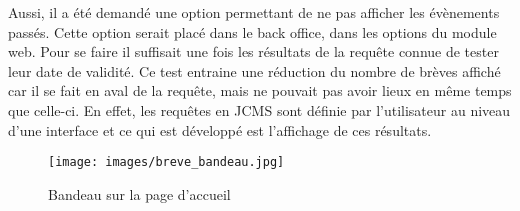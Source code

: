 \documentclass[12pt,a4paper]{article}
\begin{document}
Aussi, il a été demandé une option permettant de ne pas afficher les évènements passés. Cette option serait placé dans le back office, dans les options du module web. Pour se faire il suffisait une fois les résultats de la requête connue de tester leur date de validité. Ce test entraine une réduction du nombre de brèves affiché car il se fait en aval de la requête, mais ne pouvait pas avoir lieux en même temps que celle-ci. En effet, les requêtes en \gls{JCMS} sont définie par l'utilisateur au niveau d'une interface et ce qui est développé est l'affichage de ces résultats.\par
\begin{figure}[h!]
\centering\texttt{[image: images/breve\_bandeau.jpg]} 
\caption{Bandeau sur la page d'accueil}
\end{figure}
\end{document}
